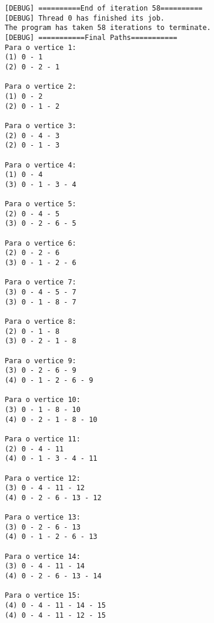 \documentclass[a4paper,11pt]{article}
\begin{document}
\begin{verbatim}
[DEBUG] ==========End of iteration 58==========
[DEBUG] Thread 0 has finished its job.
The program has taken 58 iterations to terminate.
[DEBUG] ===========Final Paths===========
Para o vertice 1:
(1) 0 - 1
(2) 0 - 2 - 1

Para o vertice 2:
(1) 0 - 2
(2) 0 - 1 - 2

Para o vertice 3:
(2) 0 - 4 - 3
(2) 0 - 1 - 3

Para o vertice 4:
(1) 0 - 4
(3) 0 - 1 - 3 - 4

Para o vertice 5:
(2) 0 - 4 - 5
(3) 0 - 2 - 6 - 5

Para o vertice 6:
(2) 0 - 2 - 6
(3) 0 - 1 - 2 - 6

Para o vertice 7:
(3) 0 - 4 - 5 - 7
(3) 0 - 1 - 8 - 7

Para o vertice 8:
(2) 0 - 1 - 8
(3) 0 - 2 - 1 - 8

Para o vertice 9:
(3) 0 - 2 - 6 - 9
(4) 0 - 1 - 2 - 6 - 9

Para o vertice 10:
(3) 0 - 1 - 8 - 10
(4) 0 - 2 - 1 - 8 - 10

Para o vertice 11:
(2) 0 - 4 - 11
(4) 0 - 1 - 3 - 4 - 11

Para o vertice 12:
(3) 0 - 4 - 11 - 12
(4) 0 - 2 - 6 - 13 - 12

Para o vertice 13:
(3) 0 - 2 - 6 - 13
(4) 0 - 1 - 2 - 6 - 13

Para o vertice 14:
(3) 0 - 4 - 11 - 14
(4) 0 - 2 - 6 - 13 - 14

Para o vertice 15:
(4) 0 - 4 - 11 - 14 - 15
(4) 0 - 4 - 11 - 12 - 15

\end{verbatim}
\end{document}
